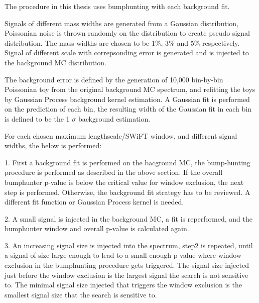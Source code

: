     The procedure in this thesis uses bumphunting with each background fit.

    Signals of different mass widths are generated from a Gaussian distribution, Poissonian noise is thrown randomly on the distribution to create pseudo signal distribution. The mass widths are chosen to be 1\%, 3\% and 5\% respectively. Signal of different scale with correpsonding error is generated and is injected to the background MC distribution.

    The background error is defined by the generation of 10,000 bin-by-bin Poissonian toy from the original background MC spectrum, and refitting the toys by Gaussian Process background kernel estimation. A Gaussian fit is performed on the prediction of each bin, the resulting width of the Gaussian fit in each bin is defined to be the 1 $\sigma$ background estimation. 

   For each chosen maximum lengthscale/SWiFT window, and different signal widths, the below is performed:

   1. First a background fit is performed on the bacground MC, the bump-hunting~\cite{choudalakis2011hypothesis} procedure is performed as described in the above section. If the overall bumphunter p-value is below the critical value for window exclusion, the next step is performed. Otherwise, the background fit strategy has to be reviewed. A different fit function or Gaussian Process kernel is needed.

   2. A small signal is injected in the background MC, a fit is reperformed, and the bumphunter window and overall p-value is calculated again. 

   3. An increasing signal size is injected into the spectrum, step2 is repeated, until a signal of size large enough to lead to a small enough p-value where window exclusion in the bumphunting procedure gets triggered. The signal size injected just before the window exclusion is the largest signal the search is not sensitive to. The minimal signal size injected that triggers the window exclusion is the smallest signal size that the search is sensitive to. 

%

